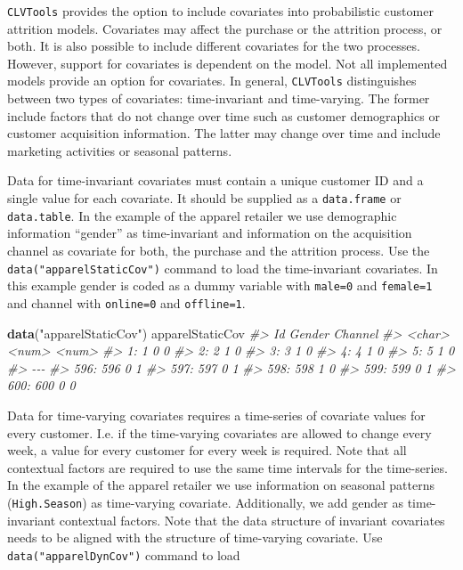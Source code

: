 \documentclass[
]{article}
\newenvironment{Shaded}{\begin{snugshade}}{\end{snugshade}}
\newcommand{\CommentTok}[1]{\textcolor[rgb]{0.56,0.35,0.01}{\textit{#1}}}
\newcommand{\FunctionTok}[1]{\textcolor[rgb]{0.13,0.29,0.53}{\textbf{#1}}}
\newcommand{\NormalTok}[1]{#1}
\newcommand{\StringTok}[1]{\textcolor[rgb]{0.31,0.60,0.02}{#1}}
\begin{document}
\texttt{CLVTools} provides the option to include covariates into
probabilistic customer attrition models. Covariates may affect the
purchase or the attrition process, or both. It is also possible to
include different covariates for the two processes. However, support for
covariates is dependent on the model. Not all implemented models provide
an option for covariates. In general, \texttt{CLVTools} distinguishes
between two types of covariates: time-invariant and time-varying. The
former include factors that do not change over time such as customer
demographics or customer acquisition information. The latter may change
over time and include marketing activities or seasonal patterns.

Data for time-invariant covariates must contain a unique customer ID and
a single value for each covariate. It should be supplied as a
\texttt{data.frame} or \texttt{data.table}. In the example of the
apparel retailer we use demographic information ``gender'' as
time-invariant and information on the acquisition channel as covariate
for both, the purchase and the attrition process. Use the
\texttt{data("apparelStaticCov")} command to load the time-invariant
covariates. In this example gender is coded as a dummy variable with
\texttt{male=0} and \texttt{female=1} and channel with \texttt{online=0}
and \texttt{offline=1}.

\begin{Shaded}
\begin{Highlighting}[]
\FunctionTok{data}\NormalTok{(}\StringTok{"apparelStaticCov"}\NormalTok{)}
\NormalTok{apparelStaticCov}
\CommentTok{\#\textgreater{}          Id Gender Channel}
\CommentTok{\#\textgreater{}      \textless{}char\textgreater{}  \textless{}num\textgreater{}   \textless{}num\textgreater{}}
\CommentTok{\#\textgreater{}   1:      1      0       0}
\CommentTok{\#\textgreater{}   2:      2      1       0}
\CommentTok{\#\textgreater{}   3:      3      1       0}
\CommentTok{\#\textgreater{}   4:      4      1       0}
\CommentTok{\#\textgreater{}   5:      5      1       0}
\CommentTok{\#\textgreater{}  {-}{-}{-}                      }
\CommentTok{\#\textgreater{} 596:    596      0       1}
\CommentTok{\#\textgreater{} 597:    597      0       1}
\CommentTok{\#\textgreater{} 598:    598      1       0}
\CommentTok{\#\textgreater{} 599:    599      0       1}
\CommentTok{\#\textgreater{} 600:    600      0       0}
\end{Highlighting}
\end{Shaded}

Data for time-varying covariates requires a time-series of covariate
values for every customer. I.e. if the time-varying covariates are
allowed to change every week, a value for every customer for every week
is required. Note that all contextual factors are required to use the
same time intervals for the time-series. In the example of the apparel
retailer we use information on seasonal patterns (\texttt{High.Season})
as time-varying covariate. Additionally, we add gender as time-invariant
contextual factors. Note that the data structure of invariant covariates
needs to be aligned with the structure of time-varying covariate. Use
\texttt{data("apparelDynCov")} command to load
\end{document}
